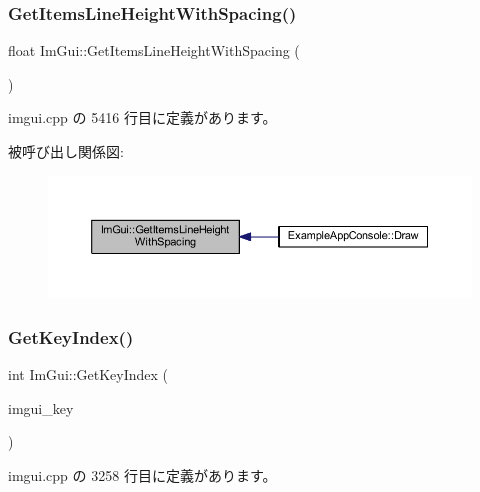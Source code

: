 \subsubsection{\texorpdfstring{Get\+Items\+Line\+Height\+With\+Spacing()}{GetItemsLineHeightWithSpacing()}}
{\footnotesize\ttfamily float Im\+Gui\+::\+Get\+Items\+Line\+Height\+With\+Spacing (\begin{DoxyParamCaption}{ }\end{DoxyParamCaption})}



 imgui.\+cpp の 5416 行目に定義があります。

被呼び出し関係図\+:\nopagebreak
\begin{figure}[H]
\begin{center}
\leavevmode
\includegraphics[width=350pt]{namespace_im_gui_a85a5202a65c0663858dba55a206761c5_icgraph}
\end{center}
\end{figure}
\mbox{\label{namespace_im_gui_a6cf235f0d0787d51a93f6d90e0bdff9b}} 
\subsubsection{\texorpdfstring{Get\+Key\+Index()}{GetKeyIndex()}}
{\footnotesize\ttfamily int Im\+Gui\+::\+Get\+Key\+Index (\begin{DoxyParamCaption}\item[{\mbox{\hyperlink{imgui_8h_a1671ca739cf1384a8cc268758f27b4e7}{Im\+Gui\+Key}}}]{imgui\+\_\+key }\end{DoxyParamCaption})}



 imgui.\+cpp の 3258 行目に定義があります。

\mbox{\label{namespace_im_gui_ad94a09fc01052f02fe11bec5a3c11275}} 
